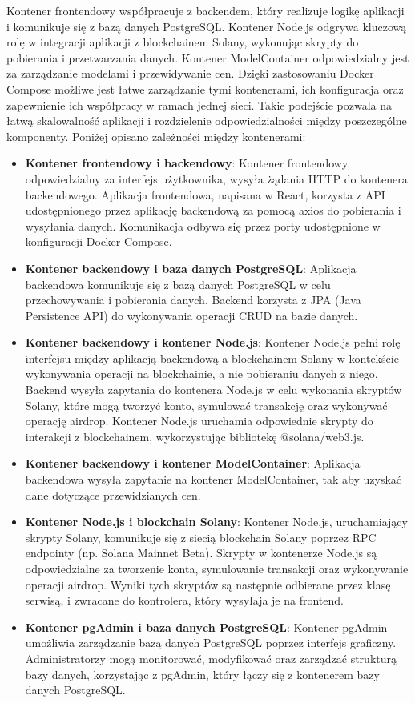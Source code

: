 Kontener frontendowy współpracuje z backendem, który realizuje logikę aplikacji i komunikuje się z bazą danych PostgreSQL. Kontener Node.js odgrywa kluczową rolę w integracji aplikacji z blockchainem Solany, wykonując skrypty do pobierania i przetwarzania danych. Kontener  ModelContainer odpowiedzialny jest za zarządzanie modelami i przewidywanie cen. Dzięki zastosowaniu Docker Compose możliwe jest łatwe zarządzanie tymi kontenerami, ich konfiguracja oraz zapewnienie ich współpracy w ramach jednej sieci. Takie podejście pozwala na łatwą skalowalność aplikacji i rozdzielenie odpowiedzialności między poszczególne komponenty. Poniżej opisano zależności między kontenerami:
\begin{itemize}
    \item \textbf{Kontener frontendowy i backendowy}: Kontener frontendowy, odpowiedzialny za interfejs użytkownika, wysyła żądania HTTP do kontenera backendowego. Aplikacja frontendowa, napisana w React, korzysta z API udostępnionego przez aplikację backendową za pomocą axios do pobierania i wysyłania danych. Komunikacja odbywa się przez porty udostępnione w konfiguracji Docker Compose.
    \item \textbf{Kontener backendowy i baza danych PostgreSQL}: Aplikacja backendowa komunikuje się z bazą danych PostgreSQL w celu przechowywania i pobierania danych. Backend korzysta z JPA (Java Persistence API) do wykonywania operacji CRUD na bazie danych.
    \item \textbf{Kontener backendowy i kontener Node.js}: Kontener Node.js pełni rolę interfejsu między aplikacją backendową a blockchainem Solany w kontekście wykonywania operacji na blockchainie, a nie pobieraniu danych z niego. Backend wysyła zapytania do kontenera Node.js w celu wykonania skryptów Solany, które mogą tworzyć konto, symulować transakcję oraz wykonywać operację airdrop. Kontener Node.js uruchamia odpowiednie skrypty do interakcji z blockchainem, wykorzystując bibliotekę @solana/web3.js.
		\item \textbf{Kontener backendowy i kontener ModelContainer}: Aplikacja backendowa wysyła zapytanie na kontener ModelContainer, tak aby uzyskać dane dotyczące przewidzianych cen. 
    \item \textbf{Kontener Node.js i blockchain Solany}: Kontener Node.js, uruchamiający skrypty Solany, komunikuje się z siecią blockchain Solany poprzez RPC endpointy (np. Solana Mainnet Beta). Skrypty w kontenerze Node.js są odpowiedzialne za tworzenie konta, symulowanie transakcji oraz wykonywanie operacji airdrop. Wyniki tych skryptów są następnie odbierane przez klasę serwisą, i zwracane do kontrolera, który wysyłaja je na frontend.
    \item \textbf{Kontener pgAdmin i baza danych PostgreSQL}: Kontener pgAdmin umożliwia zarządzanie bazą danych PostgreSQL poprzez interfejs graficzny. Administratorzy mogą monitorować, modyfikować oraz zarządzać strukturą bazy danych, korzystając z pgAdmin, który łączy się z kontenerem bazy danych PostgreSQL.
\end{itemize}

